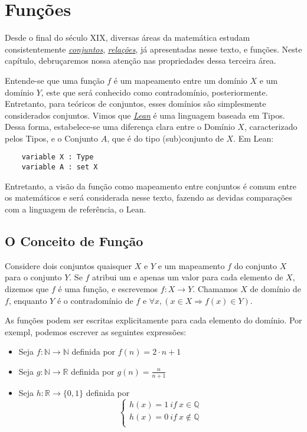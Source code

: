 \chapter{Funções}

Desde o final do século XIX, diversas áreas da matemática 
estudam consistentemente \textit{\hyperlink{chapter.4}{conjuntos}}, 
\textit{\hyperlink{chapter.5}{relações}}, já apresentadas 
nesse texto, e funções. Neste capítulo, debruçaremos nossa 
atenção nas propriedades dessa terceira área. 

Entende-se que uma função $f$ é um mapeamento entre um 
domínio $X$ e um domínio $Y$, este que será conhecido como 
contradomínio, posteriormente. Entretanto, para teóricos 
de conjuntos, esses domínios são simplesmente considerados 
conjuntos. Vimos que \textit{\hyperlink{chapter.2}{Lean}} é uma 
linguagem baseada em Tipos. Dessa forma, estabelece-se uma 
diferença clara entre o Domínio $X$, caracterizado pelos Tipos, e
o Conjunto $A$, que é do tipo (sub)conjunto de $X$. Em Lean: 
\begin{lstlisting}
    variable X : Type
    variable A : set X    
\end{lstlisting}

Entretanto, a visão da função como mapeamento entre conjuntos
é comum entre os matemáticos e será considerada nesse texto,
fazendo as devidas comparações com a linguagem de referência, 
o Lean. 

\section{O Conceito de Função}

Considere dois conjuntos quaisquer $X$ e $Y$ e um mapeamento $f$ 
do conjunto $X$ para o conjunto $Y$. Se $f$ atribui um e apenas 
um valor para cada elemento de $X$, dizemos que $f$ é uma função, e
escrevemos $f: X \to Y$. Chamamos $X$ de domínio de $f$, enquanto 
$Y$ é o contradomínio de $f$ e $\forall x, (x \in X  \Rightarrow f(x) \in Y)$. 

As funções podem ser escritas explicitamente para cada elemento 
do domínio. Por exempl, podemos escrever as seguintes expressões:

\begin{itemize}
    \item Seja $f: \mathbb{N} \to \mathbb{N}$ definida por 
    $f(n) = 2\cdot n + 1$
    \item Seja $g : \mathbb{N} \to \mathbb{R}$ definida por 
    $g(n) = \frac{n}{n+1}$
    \item Seja $h : \mathbb{R} \to \{0,1\}$ definida por 
    $$\left \{ \begin{array}{c}
    h(x) = 1 ~if~x \in \mathbb{Q} \\
    h(x) = 0 ~ if ~ x \not \in \mathbb{Q} \\
    \end{array}
    \right. $$
 \end{itemize}

